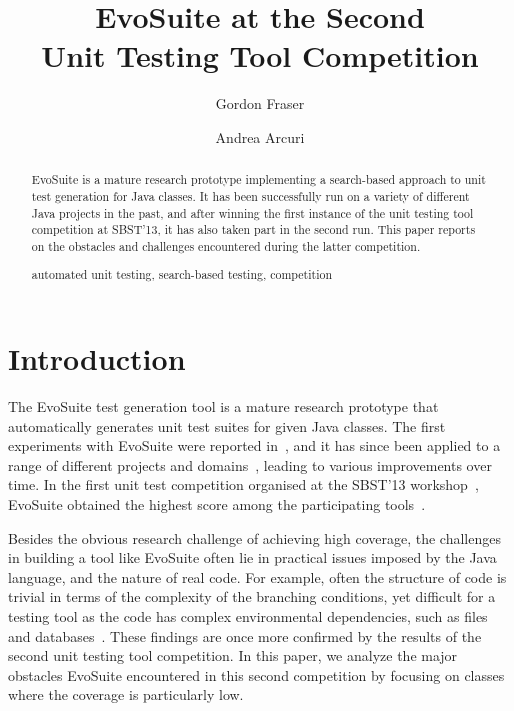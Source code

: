 \documentclass[runningheads,a4paper]{llncs}
\newcommand{\keywords}[1]{\par\addvspace\baselineskip
\noindent\keywordname\enspace\ignorespaces#1}
\newcommand{\EVOSUITE}{{\sc EvoSuite}\xspace}
\begin{document}
\mainmatter
\title{EvoSuite at the Second \\ Unit Testing Tool Competition}
\author{Gordon Fraser \and Andrea Arcuri}
%


\maketitle

\begin{abstract}
  \EVOSUITE is a mature research prototype implementing a search-based
  approach to unit test generation for Java classes. It has been
  successfully run on a variety of different Java projects in the
  past, and after winning the first instance of the unit testing tool
  competition at SBST'13, it has also taken part in the second
  run. This paper reports on the obstacles and challenges encountered
  during the latter competition.

\keywords{automated unit testing, search-based testing, competition}
\end{abstract}


\section{Introduction}

The \EVOSUITE test generation tool is a mature research prototype that
automatically generates unit test suites for given Java classes. The
first experiments with \EVOSUITE were reported in~\cite{FrA11b}, and
it has since been applied to a range of different projects and
domains~\cite{GoA_TSE12,FrA12b}, leading to various improvements over
time. 
In the first unit test competition organised at the SBST'13 workshop~\cite{sbst2013},
\EVOSUITE obtained the highest score among the participating tools~\cite{evosuiteAtSbst2013}.

Besides the obvious research challenge of achieving high coverage, the
challenges in building a tool like \EVOSUITE often lie in practical
issues imposed by the Java language, and the nature of real code. For
example, often the structure of code is trivial in terms of the
complexity of the branching conditions, yet difficult for a testing
tool as the code has complex environmental dependencies, such as files
and databases~\cite{FrA13a}. These findings are once more confirmed by
the results of the second unit testing tool competition.
In this paper, we analyze the major obstacles \EVOSUITE encountered in
this second competition by focusing on classes where the coverage is
particularly low.
\end{document}
